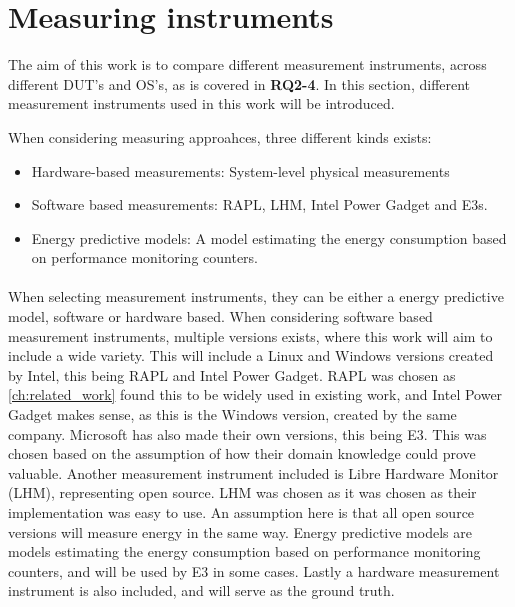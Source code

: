 \section{Measuring instruments}\label{sec:measuring_instruments}

The aim of this work is to compare different measurement instruments, across different DUT's and OS's, as is covered in \textbf{RQ2-4}. In this section, different measurement instruments used in this work will be introduced.

When considering measuring approahces, three different kinds exists:

\begin{itemize}
    \item Hardware-based measurements: System-level physical measurements
    \item Software based measurements: RAPL, LHM, Intel Power Gadget and E3s.
    \item Energy predictive models: A model estimating the energy consumption based on performance monitoring counters.
\end{itemize}

\paragraph*{}
When selecting measurement instruments, they can be either a energy predictive model, software or hardware based. When considering software based measurement instruments, multiple versions exists, where this work will aim to include a wide variety. This will include a Linux and Windows versions created by Intel, this being RAPL and Intel Power Gadget. RAPL was chosen as \cref*{ch:related_work} found this to be widely used in existing work, and Intel Power Gadget makes sense, as this is the Windows version, created by the same company. Microsoft has also made their own versions, this being E3. This was chosen based on the assumption of how their domain knowledge could prove valuable. Another measurement instrument included is Libre Hardware Monitor (LHM), representing open source. LHM was chosen as it was chosen as their implementation was easy to use. An assumption here is that all open source versions will measure energy in the same way. Energy predictive models are models estimating the energy consumption based on performance monitoring counters, and will be used by E3 in some cases. Lastly a hardware measurement instrument is also included, and will serve as the ground truth.



